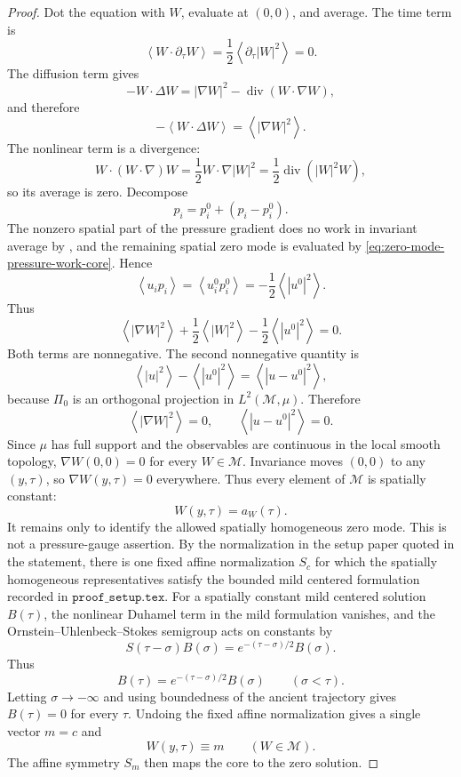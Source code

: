 \documentclass[11pt]{amsart}
\numberwithin{equation}{section}
\theoremstyle{plain}
\theoremstyle{definition}
\theoremstyle{remark}
\newcommand{\divergence}{\operatorname{div}}
\newcommand{\calM}{\mathcal M}
\begin{document}
\begin{proof}
Dot the equation with \(W\), evaluate at \((0,0)\), and average.  The time
term is
\[
   \left\langle W\cdot\partial_\tau W\right\rangle
   =\frac12\left\langle\partial_\tau |W|^2\right\rangle=0 .
\]
The diffusion term gives
\[
   -W\cdot\Delta W
   =
   |\nabla W|^2-\divergence(W\cdot\nabla W),
\]
and therefore
\[
   -\left\langle W\cdot\Delta W\right\rangle
   =
   \left\langle|\nabla W|^2\right\rangle .
\]
The nonlinear term is a divergence:
\[
   W\cdot(W\cdot\nabla)W
   =
   \frac12W\cdot\nabla |W|^2
   =
   \frac12\divergence(|W|^2W),
\]
so its average is zero.  Decompose
\[
   p_i=p_i^0+(p_i-p_i^0).
\]
The nonzero spatial part of the pressure gradient does no work in invariant
average by , and the remaining
spatial zero mode is evaluated by
\eqref{eq:zero-mode-pressure-work-core}.  Hence
\[
   \left\langle u_ip_i\right\rangle
   =
   \left\langle u_i^0p_i^0\right\rangle
   =
   -\frac12\left\langle|u^0|^2\right\rangle .
\]
Thus
\begin{equation}\label{eq:mean-energy-core}
   \left\langle|\nabla W|^2\right\rangle
   +\frac12\left\langle|W|^2\right\rangle
   -\frac12\left\langle|u^0|^2\right\rangle=0.
\end{equation}
Both terms are nonnegative.  The second nonnegative quantity is
\[
   \left\langle|u|^2\right\rangle-\left\langle|u^0|^2\right\rangle
   =
   \left\langle|u-u^0|^2\right\rangle,
\]
because \(\Pi_0\) is an orthogonal projection in \(L^2(\calM,\mu)\).
Therefore
\[
   \left\langle|\nabla W|^2\right\rangle=0,
   \qquad
   \left\langle|u-u^0|^2\right\rangle=0 .
\]
Since \(\mu\) has full support and the observables are continuous in the local
smooth topology, \(\nabla W(0,0)=0\) for every \(W\in\calM\).  Invariance
moves \((0,0)\) to any \((y,\tau)\), so \(\nabla W(y,\tau)=0\) everywhere.
Thus every element of \(\calM\) is spatially constant:
\[
   W(y,\tau)=a_W(\tau).
\]
It remains only to identify the allowed spatially homogeneous zero mode.  This
is not a pressure-gauge assertion.  By the normalization in the setup paper
quoted in the statement, there is one fixed affine normalization \(S_c\) for which
the spatially homogeneous representatives satisfy the bounded mild centered
formulation recorded in \(\texttt{proof\_setup.tex}\).  For a spatially constant
mild centered solution \(B(\tau)\), the nonlinear Duhamel term in the mild
formulation vanishes, and the Ornstein--Uhlenbeck--Stokes semigroup acts on
constants by
\[
   S(\tau-\sigma)B(\sigma)=e^{-(\tau-\sigma)/2}B(\sigma).
\]
Thus
\[
   B(\tau)=e^{-(\tau-\sigma)/2}B(\sigma)
   \qquad(\sigma<\tau).
\]
Letting \(\sigma\to-\infty\) and using boundedness of the ancient trajectory
gives \(B(\tau)=0\) for every \(\tau\).  Undoing the fixed affine
normalization gives a single vector \(m=c\) and
\[
   W(y,\tau)\equiv m
   \qquad(W\in\calM).
\]
The affine symmetry \(S_m\) then maps the core to the zero solution.
\end{proof}
\end{document}
